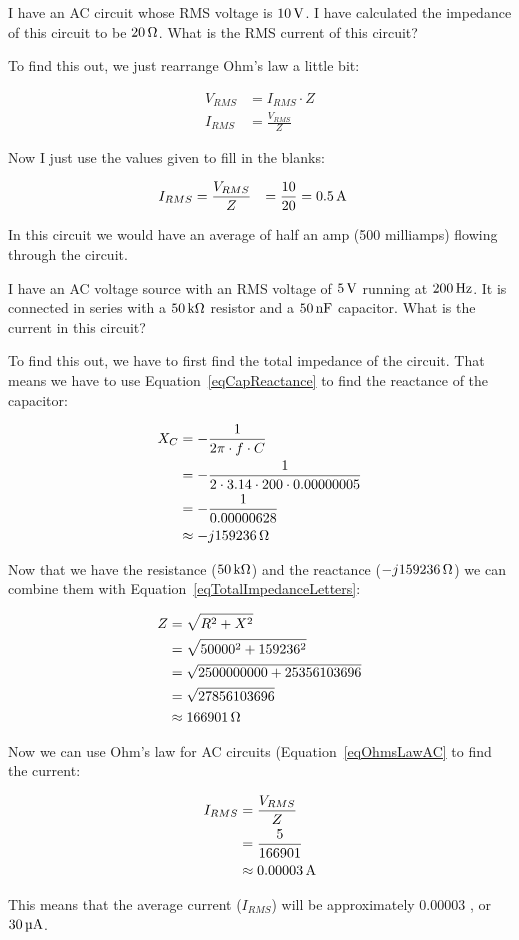 \begin{exampleprob}
I have an AC circuit whose RMS voltage is $10\,\si{\volt}$.
I have calculated the impedance of this circuit to be $20\,\si{\ohm}$.
What is the RMS current of this circuit?

To find this out, we just rearrange Ohm's law a little bit:

\begin{align*}
V_{RMS} &= I_{RMS} \cdot Z \\
I_{RMS} &= \frac{V_{RMS}}{Z}
\end{align*}

Now I just use the values given to fill in the blanks:

\begin{align*}
I_{RMS} &= \frac{V_{RMS}}{Z}
 &= \frac{10}{20}
 &= 0.5\,\si{\ampere}
\end{align*}

In this circuit we would have an average of half an amp (500 milliamps) flowing through the circuit.
\end{exampleprob}

\begin{exampleprob}
I have an AC voltage source with an RMS voltage of $5\,\si{\volt}$ running at $200\,\si{\hertz}$.
It is connected in series with a $50\,\si{\kilo\ohm}$ resistor and a $50\,\si{\nano\farad}$ capacitor.
What is the current in this circuit?

To find this out, we have to first find the total impedance of the circuit.
That means we have to use Equation~\ref{eqCapReactance} to find the reactance of the capacitor:

\begin{align*}
X_C &= -\frac{1}{2\pi\cdot f\cdot C} \\
    &= -\frac{1}{2\cdot 3.14\cdot 200 \cdot 0.00000005} \\
    &= -\frac{1}{0.00000628} \\
    &\approx -j159236\,\si{\ohm}
\end{align*}

Now that we have the resistance ($50\,\si{\kilo\ohm}$) and the reactance ($-j159236\,\si{\ohm}$) we can combine them with Equation~\ref{eqTotalImpedanceLetters}:

\begin{align*}
Z &= \sqrt{R^2 + X^2} \\
  &= \sqrt{50000^2 + 159236^2} \\
  &= \sqrt{2500000000 + 25356103696} \\
  &= \sqrt{27856103696} \\
  &\approx 166901\,\si{\ohm}
\end{align*}

Now we can use Ohm's law for AC circuits (Equation~\ref{eqOhmsLawAC} to find the current:

\begin{align*}
I_{RMS} &= \frac{V_{RMS}}{Z} \\
        &= \frac{5}{166901} \\
        &\approx 0.00003\,\si{\ampere}
\end{align*}

This means that the average current ($I_{RMS}$) will be approximately $0.00003$ \myamp, or $30\,\si{\micro\ampere}$.
\end{exampleprob}

